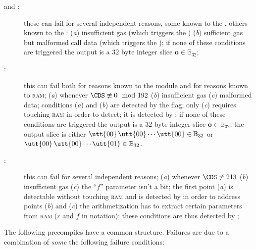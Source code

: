\begin{description}
	\item[\instEcadd{} and \instEcmul{}:]
		these can fail for several independent reasons, some known to the \hubMod{}, others known to the \mmuMod{}:
		(\emph{a}) insufficient gas (which triggers the \scenPrcFailureKnownToHub{})
		(\emph{b}) sufficient gas but malformed call data (which triggers the \scenPrcFailureKnownToRam{});
		if none of these conditions are triggered the output is a 32 byte integer slice $\textbf{o} \in \mathbb{B}_{32}$;
	\item[:]
		this can fail both for reasons known to the \hubMod{} module and for reasons known to \textsc{ram};
		(\emph{a}) whenever $\CDS \not\equiv 0 \mod 192$
		(\emph{b}) insufficient gas
		(\emph{c}) malformed data;
		conditions (\emph{a}) and (\emph{b}) are detected by the \scenPrcFailureKnownToHub{} flag;
		only (\emph{c}) requires touching \textsc{ram} in order to detect;
		it is detected by \scenPrcFailureKnownToRam{};
		if none of these conditions are triggered the output is a 32 byte integer slice $\textbf{o} \in \mathbb{B}_{32}$;
		the output slice is either
		$
		\utt{00}\,
		\utt{00} \cdots
		\utt{00} \in \mathbb{B}_{32}$
		or
		$
		\utt{00}\,
		\utt{00} \cdots
		\utt{01} \in \mathbb{B}_{32}$.
	\item[\instBlake{}:]
		this can fail for several independent reasons;
		(\emph{a}) whenever $\CDS \neq 213$
		(\emph{b}) insufficient gas
		(\emph{c}) the ``$f$'' parameter isn't a bit;
		the first point (\emph{a}) is detectable without touching \textsc{ram} and is detected by \scenPrcFailureKnownToHub{} 
		in order to address points (\emph{b}) and (\emph{c}) the arithmetization has to extract certain parameters from \textsc{ram} ($r$ and $f$ in \cite{EYP-London} notation);
		these conditions are thus detected by \scenPrcFailureKnownToRam{};
\end{description}
The following precompiles have a common structure.
Failures are due to a combination of \emph{some} the following failure conditions:
